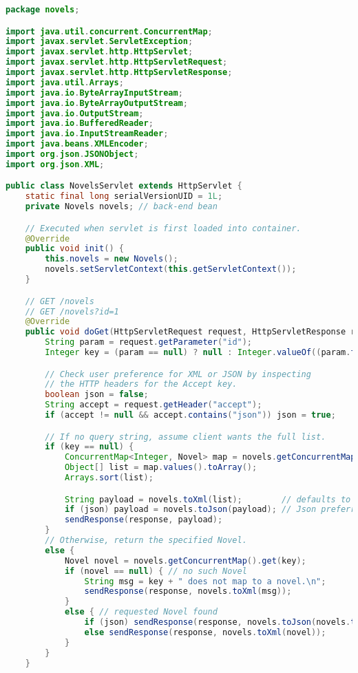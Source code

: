 \documentclass[12pt]{article}
\begin{document}
\begin{lstlisting}[language=java]
package novels;

import java.util.concurrent.ConcurrentMap;
import javax.servlet.ServletException;
import javax.servlet.http.HttpServlet;
import javax.servlet.http.HttpServletRequest;
import javax.servlet.http.HttpServletResponse;
import java.util.Arrays;
import java.io.ByteArrayInputStream;
import java.io.ByteArrayOutputStream;
import java.io.OutputStream;
import java.io.BufferedReader;
import java.io.InputStreamReader;
import java.beans.XMLEncoder;
import org.json.JSONObject;
import org.json.XML;

public class NovelsServlet extends HttpServlet {
    static final long serialVersionUID = 1L;
    private Novels novels; // back-end bean

    // Executed when servlet is first loaded into container.
    @Override
    public void init() {
        this.novels = new Novels();
        novels.setServletContext(this.getServletContext());
    }

    // GET /novels
    // GET /novels?id=1
    @Override
    public void doGet(HttpServletRequest request, HttpServletResponse response) {
        String param = request.getParameter("id");
        Integer key = (param == null) ? null : Integer.valueOf((param.trim()));

        // Check user preference for XML or JSON by inspecting
        // the HTTP headers for the Accept key.
        boolean json = false;
        String accept = request.getHeader("accept");
        if (accept != null && accept.contains("json")) json = true;

        // If no query string, assume client wants the full list.
        if (key == null) {
            ConcurrentMap<Integer, Novel> map = novels.getConcurrentMap();
            Object[] list = map.values().toArray();
            Arrays.sort(list);

            String payload = novels.toXml(list);        // defaults to Xml
            if (json) payload = novels.toJson(payload); // Json preferred?
            sendResponse(response, payload);
        }
        // Otherwise, return the specified Novel.
        else {
            Novel novel = novels.getConcurrentMap().get(key);
            if (novel == null) { // no such Novel
                String msg = key + " does not map to a novel.\n";
                sendResponse(response, novels.toXml(msg));
            }
            else { // requested Novel found
                if (json) sendResponse(response, novels.toJson(novels.toXml(novel)));
                else sendResponse(response, novels.toXml(novel));
            }
        }
    }


\end{lstlisting}
\end{document}
